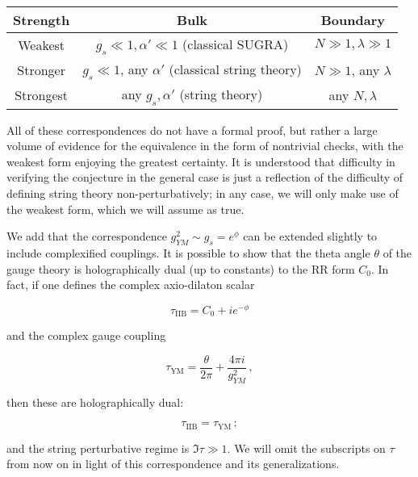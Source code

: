 \begin{center}
	\begin{tabular}{c||c|c}
		Strength	& Bulk & Boundary\\ \midrule\midrule
		Weakest & $g_s \ll 1, \alpha' \ll 1$ (classical SUGRA) 	& $N\gg 1,\lambda \gg 1$	\\
		Stronger& $g_s \ll 1$, any $\alpha'$ (classical string theory)	&  $N\gg 1$, any $\lambda$	\\
		Strongest& any $g_s,\alpha'$ (string theory)	&  any $N,\lambda$\\
	\end{tabular}
\end{center}



All of these correspondences do not have a formal proof, but rather a large volume of evidence for the equivalence in the form of nontrivial checks, with the weakest form enjoying the greatest certainty. It is understood that difficulty in verifying the conjecture in the general case is just a reflection of the difficulty of defining string theory non-perturbatively; in any case, we will only make use of the weakest form, which we will assume as true.

We add that the correspondence $g_{YM}^2 \sim g_s = e^\phi$ can be extended slightly to include complexified couplings. It is possible to show that the theta angle $\theta$ of the gauge theory is holographically dual (up to constants) to the RR form $C_0$. In fact, if one defines the complex axio-dilaton scalar

\begin{equation}
	\tau_\mathrm{IIB} = C_0 + ie^{-\phi}
	\label{}
\end{equation}

and the complex gauge coupling

\begin{equation}
	\tau_\mathrm{YM} = \frac{\theta}{2\pi} + \frac{4\pi i}{g_{YM}^2}\,,
	\label{}
\end{equation}

then these are holographically dual:

\begin{equation}
	\tau_\mathrm{IIB} = \tau_\mathrm{YM}\,;
	\label{}
\end{equation}

and the string perturbative regime is $\Im \tau \gg 1$. We will omit the subscripts on $\tau$ from now on in light of this correspondence and its generalizations.


